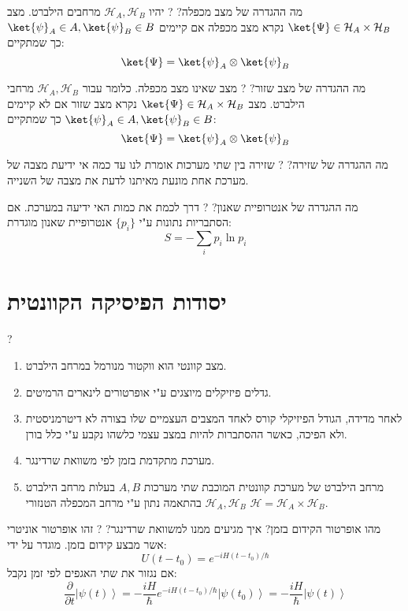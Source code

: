 \documentclass{tstextbook}
\begin{document}
מה ההגדרה של מצב מכפלה?
?
יהיו \(\mathcal{H}_{A},\mathcal{H}_{B}\) מרחבים הילברט. מצב \(\ket{\Psi}\in \mathcal{H}_{A}\times \mathcal{H}_{B}\) נקרא מצב מכפלה אם קיימים \(\ket{\psi}_{A}\in A,\ket{\psi}_{B}\in B\) כך שמתקיים:
$$\ket{\Psi} =\ket{\psi} _{A}\otimes \ket{\psi} _{B}$$

מה ההגדרה של מצב שזור?
?
מצב שאינו מצב מכפלה. כלומר עבור \(\mathcal{H}_{A},\mathcal{H}_{B}\) מרחבי הילברט. מצב \(\ket{\Psi}\in \mathcal{H}_{A}\times \mathcal{H}_{B}\) נקרא מצב שזור אם לא קיימים \(\ket{\psi}_{A}\in A,\ket{\psi}_{B}\in B\) כך שמתקיים:
$$\ket{\Psi} =\ket{\psi} _{A}\otimes \ket{\psi} _{B}$$

מה ההגדרה של שזירה?
?
שזירה בין שתי מערכות אומרת לנו עד כמה אי ידיעת מצבה של מערכת אחת מונעת מאיתנו לדעת את מצבה של השנייה.

מה ההגדרה של אנטרופיית שאנון?
?
דרך לכמת את כמות האי ידיעה במערכת. אם הסתבריות נתונות ע"י \(\{ p_{i} \}\) אנטרופיית שאנון מוגדרת:
$$S=-\sum_{i}p_{i}\ln p_{i}$$

\section{יסודות הפיסיקה הקוונטית}

?

\begin{enumerate}
  \item מצב קוונטי הוא ווקטור מנורמל במרחב הילברט. 


  \item גדלים פיזיקלים מיוצגים ע"י אופרטורים לינארים הרמיטים. 


  \item לאחר מדידה, הגודל הפיזיקלי קורס לאחד המצבים העצמיים שלו בצורה לא דיטרמניסטית ולא הפיכה, כאשר ההסתברות להיות במצב עצמי כלשהו נקבע ע"י כלל בורן. 


  \item מערכת מתקדמת בזמן לפי משוואת שרדינגר. 


  \item מרחב הילברט של מערכת קוונטית המוכבת שתי מערכות \(A,B\) בעלות מרחב הילברט \(\mathcal{H}_{A},\mathcal{H}_{B}\) בהתאמה נתון ע"י מרחב המכפלה הטנזורי \(\mathcal{H}=\mathcal{H}_{A}\times \mathcal{H}_{B}\). 


\end{enumerate}
מהו אופרטור הקידום בזמן? איך מגיעים ממנו למשוואת שרדינגר?
?
זהו אופרטור אוניטרי אשר מבצע קידום בזמן. מוגדר על ידי:
$$U\left(t-t_{0}\right)=e^{-i H\left(t-t_{0}\right)/\hbar}$$
אם נגזור את שתי האגפים לפי זמן נקבל:
$$\frac{\partial}{\partial t}\left|\psi\left(t\right)\right\rangle=-\frac{i H}{\hbar}e^{-i H\left(t-t_{0}\right)/\hbar}\left|\psi\left(t_{0}\right)\right\rangle=-\frac{i H}{\hbar}\left|\psi\left(t\right)\right\rangle$$
\end{document}
